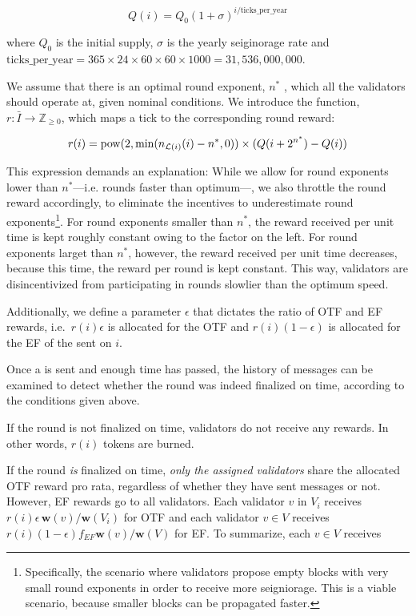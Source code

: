 \begin{equation}
Q(i) = Q_0 (1+\sigma)^{i/\text{ticks\_per\_year}}
\end{equation}

where $Q_0$ is the initial supply, $\sigma$ is the yearly seiginorage rate and $\text{ticks\_per\_year} = 365\times 24\times 60 \times 60 \times 1000 = 31,\!536,\!000,\!000$.


We assume that there is an optimal round exponent, $n^\ast$ , which all the validators should operate at, given nominal conditions. We introduce the function, $r:\bar{I}\to \mathbb{Z}_{\geq 0}$, which maps a tick to the corresponding round reward:

\begin{equation}
  r(i) = \operatorname*{pow}(2, {\min(n_{\mathcal{L}(i)}(i) - n^\ast, 0)}) \times (Q(i + 2^{n^\ast}) - Q(i))
\end{equation}

This expression demands an explanation: While we allow for round exponents lower than $n^\ast$---i.e. rounds faster than optimum---, we also throttle the round reward accordingly, to eliminate the incentives to underestimate round exponents\footnote{Specifically, the scenario where validators propose empty blocks with very small round exponents in order to receive more seigniorage. This is a viable scenario, because smaller blocks can be propagated faster.}. For round exponents smaller than $n^\ast$, the reward received per unit time is kept roughly constant owing to the factor on the left. For round exponents larget than $n^\ast$, however, the reward received per unit time decreases, because this time, the reward per round is kept constant. This way, validators are disincentivized from participating in rounds slowlier than the optimum speed.

Additionally, we define a parameter $\epsilon$ that dictates the ratio of OTF and EF rewards, i.e.~$r(i)\epsilon$ is allocated for the OTF and $r(i)(1-\epsilon)$ is allocated for the EF of the \PROP sent on $i$.

Once a \PROP is sent and enough time has passed, the history of messages can be examined to detect whether the round was indeed finalized on time, according to the conditions given above.

If the round is not finalized on time, validators do not receive any rewards. In other words, $r(i)$ tokens are burned.

If the round \emph{is} finalized on time, \emph{only the assigned validators} share the allocated OTF reward pro rata, regardless of whether they have sent messages or not. However, EF rewards go to all validators. Each validator $v$ in $V_i$ receives $r(i)\epsilon \,\boldsymbol{w}(v)/\boldsymbol{w}(V_i)$ for OTF and each validator $v\in V$ receives $r(i)(1-\epsilon)f_{EF}\boldsymbol{w}(v)/\boldsymbol{w}(V)$ for EF. To summarize, each $v\in V$ receives

